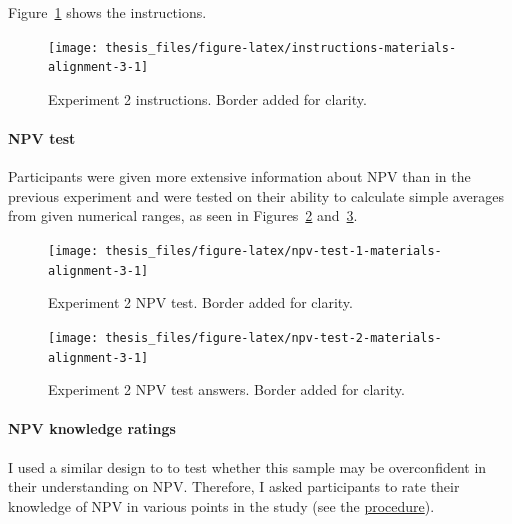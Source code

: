 \documentclass[a4paper, nobind, dvipsnames]{templates/ociamthesis}
\theoremstyle{definition}
\theoremstyle{definition}
\theoremstyle{definition}
\theoremstyle{definition}
\theoremstyle{remark}
\begin{document}
Figure~\ref{fig:instructions-materials-alignment-3} shows the instructions.



\begin{figure}
\texttt{[image: thesis\_files/figure-latex/instructions-materials-alignment-3-1]} \caption{Experiment 2 instructions. Border added for clarity.}\label{fig:instructions-materials-alignment-3}
\end{figure}

\hypertarget{npv-test-materials-alignment-3}{%
\paragraph{NPV test}\label{npv-test-materials-alignment-3}}

Participants were given more extensive information about NPV than in the
previous experiment and were tested on their ability to calculate simple
averages from given numerical ranges, as seen in
Figures~\ref{fig:npv-test-1-materials-alignment-3}
and~\ref{fig:npv-test-2-materials-alignment-3}.



\begin{figure}
\texttt{[image: thesis\_files/figure-latex/npv-test-1-materials-alignment-3-1]} \caption{Experiment 2 NPV test. Border added for clarity.}\label{fig:npv-test-1-materials-alignment-3}
\end{figure}



\begin{figure}
\texttt{[image: thesis\_files/figure-latex/npv-test-2-materials-alignment-3-1]} \caption{Experiment 2 NPV test answers. Border added for clarity.}\label{fig:npv-test-2-materials-alignment-3}
\end{figure}

\hypertarget{npv-knowledge-materials-alignment-3}{%
\paragraph{NPV knowledge ratings}\label{npv-knowledge-materials-alignment-3}}

I used a similar design to \textcite[Study 1]{long2018} to test whether this sample may
be overconfident in their understanding on NPV. Therefore, I asked participants
to rate their knowledge of NPV in various points in the study (see the
\protect\hyperlink{procedure-alignment-3}{procedure}).
\end{document}
